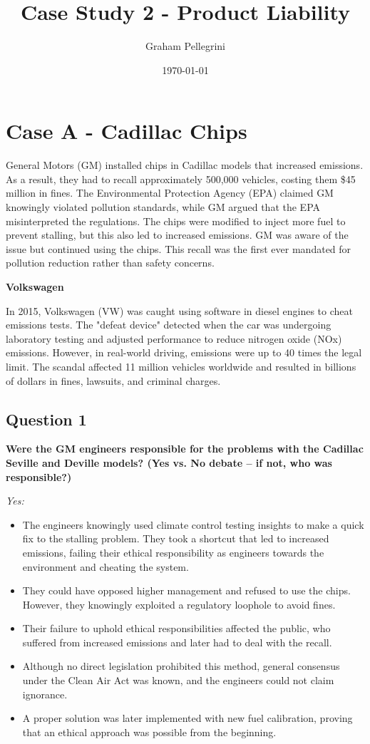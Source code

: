 \documentclass{article}
\title{Case Study 2 - Product Liability}
\author{Graham Pellegrini}
\date{\today}
\begin{document}
\maketitle

\section*{Case A - Cadillac Chips}
General Motors (GM) installed chips in Cadillac models that increased emissions. As a result, they had to recall approximately 500,000 vehicles, costing them \$45 million in fines. The Environmental Protection Agency (EPA) claimed GM knowingly violated pollution standards, while GM argued that the EPA misinterpreted the regulations. The chips were modified to inject more fuel to prevent stalling, but this also led to increased emissions. GM was aware of the issue but continued using the chips. This recall was the first ever mandated for pollution reduction rather than safety concerns.

\textbf{Volkswagen}

In 2015, Volkswagen (VW) was caught using software in diesel engines to cheat emissions tests. The "defeat device" detected when the car was undergoing laboratory testing and adjusted performance to reduce nitrogen oxide (NOx) emissions. However, in real-world driving, emissions were up to 40 times the legal limit. The scandal affected 11 million vehicles worldwide and resulted in billions of dollars in fines, lawsuits, and criminal charges.

\subsection*{Question 1}
\textbf{Were the GM engineers responsible for the problems with the Cadillac Seville and Deville models? (Yes vs. No debate – if not, who was responsible?)}

\textit{Yes:}
\begin{itemize}
    \item The engineers knowingly used climate control testing insights to make a quick fix to the stalling problem. They took a shortcut that led to increased emissions, failing their ethical responsibility as engineers towards the environment and cheating the system.
    \item They could have opposed higher management and refused to use the chips. However, they knowingly exploited a regulatory loophole to avoid fines.
    \item Their failure to uphold ethical responsibilities affected the public, who suffered from increased emissions and later had to deal with the recall.
    \item Although no direct legislation prohibited this method, general consensus under the Clean Air Act was known, and the engineers could not claim ignorance.
    \item A proper solution was later implemented with new fuel calibration, proving that an ethical approach was possible from the beginning.
\end{itemize}
\end{document}
